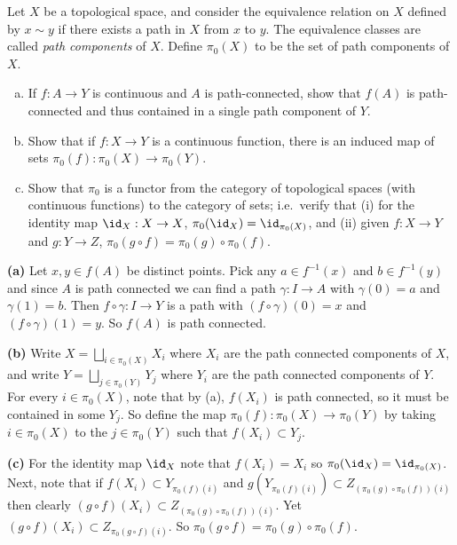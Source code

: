 \documentclass[11pt,letterpaper]{article}
\begin{document}
\begin{problem}
    Let $X$ be a topological space, and consider the equivalence relation on $X$ defined by $x\sim y$ if there exists a path in $X$ from $x$ to $y$. The equivalence classes are called {\em path components} of $X$. Define $\pi_0(X)$ to be the set of path components of $X$. 
    \begin{enumerate}[(a)]
        \item If $f:A\to Y$ is continuous and $A$ is path-connected, show that $f(A)$ is path-connected and thus contained in a single path component of $Y$.
        \item Show that if $f:X\to Y$ is a continuous function, there is an induced map of sets $\pi_0(f):\pi_0(X)\to \pi_0(Y)$. 
        \item Show that $\pi_0$ is a functor from the category of topological spaces (with continuous functions) to the category of sets; i.e.\ verify that (i) for the identity map $\id_X:X\to X$, $\pi_0(\id_X)=\id_{\pi_0(X)}$, and (ii) given $f:X\to Y$ and $g:Y\to Z$, $\pi_0(g\circ f)=\pi_0(g)\circ \pi_0(f)$.
    \end{enumerate}
\end{problem}

\begin{solution}
    \textbf{(a)} Let $x,y\in f(A)$ be distinct points. Pick any $a\in f^{-1}(x)$ and $b\in f^{-1}(y)$ and since $A$ is path connected we can find a path $\gamma : I \to A$ with $\gamma(0)=a$ and $\gamma(1)=b$. Then $f\circ \gamma : I \to Y$ is a path with $(f\circ \gamma)(0)=x$ and $(f\circ \gamma)(1)=y$. So $f(A)$ is path connected.
    
    \textbf{(b)} Write $X=\bigsqcup_{i\in \pi_0(X)}X_i$ where $X_i$ are the path connected components of $X$, and write $Y=\bigsqcup_{j\in \pi_0(Y)} Y_j$ where $Y_i$ are the path connected components of $Y$. For every $i\in \pi_0(X)$, note that by (a), $f(X_i)$ is path connected, so it must be contained in some $Y_j$. So define the map $\pi_0(f) : \pi_0(X) \to \pi_0(Y)$ by taking $i\in \pi_0(X)$ to the $j\in \pi_0(Y)$ such that $f(X_i)\subset Y_j$.    
    
    \textbf{(c)} For the identity map $\id_X$ note that $f(X_i)=X_i$ so $\pi_0(\id_X)=\id_{\pi_0(X)}$. Next, note that if $f(X_i)\subset Y_{\pi_0(f)(i)}$ and $g(Y_{\pi_0(f)(i)}) \subset Z_{(\pi_0(g)\circ\pi_0(f))(i)}$ then clearly $(g\circ f)(X_i)\subset Z_{(\pi_0(g)\circ\pi_0(f))(i)}$. Yet $(g\circ f)(X_i)\subset Z_{\pi_0(g\circ f)(i)}$. So $\pi_0(g\circ f)=\pi_0(g)\circ \pi_0(f)$.      
\end{solution}
\end{document}
